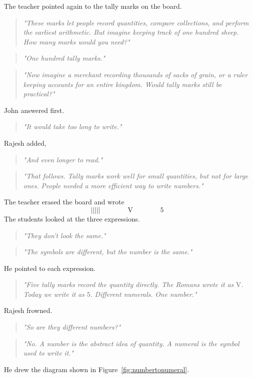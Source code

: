 \documentclass[11pt]{article}
\begin{document}
The teacher pointed again to the tally marks on the board.
\begin{quote}
\emph{"These marks let people record quantities, compare collections, and perform the earliest arithmetic. But imagine keeping track of one hundred sheep. How many marks would you need?"}
\end{quote}
\begin{quote}
\emph{"One hundred tally marks."}
\end{quote}
\begin{quote}
\emph{"Now imagine a merchant recording thousands of sacks of grain, or a ruler keeping accounts for an entire kingdom. Would tally marks still be practical?"}
\end{quote}
John answered first.
\begin{quote}
\emph{"It would take too long to write."}
\end{quote}
Rajesh added,
\begin{quote}
\emph{"And even longer to read."}
\end{quote}
\begin{quote}
\emph{"That follows. Tally marks work well for small quantities, but not for large ones. People needed a more efficient way to write numbers."}
\end{quote}
The teacher erased the board and wrote
\[
||||| \qquad\qquad \mathrm{V} \qquad\qquad 5
\]
The students  looked at  the three expressions.
\begin{quote}
\emph{"They don't look the same."}
\end{quote}
\begin{quote}
\emph{"The symbols are different, but the number is the same."}
\end{quote}
He pointed to each expression.
\begin{quote}
\emph{"Five tally marks record the quantity directly. The Romans wrote it as \(\mathrm{V}\). Today we write it as \(5\). Different numerals. One number."}
\end{quote}
Rajesh frowned.
\begin{quote}
\emph{"So are they different numbers?"}
\end{quote}
\begin{quote}
\emph{"No. A number is the abstract idea of quantity. A numeral is the symbol used to write it."}
\end{quote}
He drew the diagram shown in Figure~\ref{fig:numbertonumeral}.
\end{document}
